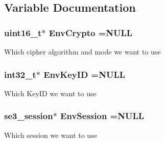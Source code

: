\subsection{Variable Documentation}
\hypertarget{group___environmental_vars_ga328037c714e95e56186f9d5f0842adea}{
\subsubsection[{Env\-Crypto}]{\setlength{\rightskip}{0pt plus 5cm}uint16\-\_\-t$\ast$ Env\-Crypto =N\-U\-L\-L\hspace{0.3cm}{\ttfamily [static]}}}\label{group___environmental_vars_ga328037c714e95e56186f9d5f0842adea}
Which cipher algorithm and mode we want to use \hypertarget{group___environmental_vars_ga7a8b4d6945f6a13f8683427dc7ab7a44}{
\subsubsection[{Env\-Key\-I\-D}]{\setlength{\rightskip}{0pt plus 5cm}int32\-\_\-t$\ast$ Env\-Key\-I\-D =N\-U\-L\-L\hspace{0.3cm}{\ttfamily [static]}}}\label{group___environmental_vars_ga7a8b4d6945f6a13f8683427dc7ab7a44}
Which Key\-I\-D we want to use \hypertarget{group___environmental_vars_gad3215e338581ce95b76b3b84b928d744}{
\subsubsection[{Env\-Session}]{\setlength{\rightskip}{0pt plus 5cm}se3\-\_\-session$\ast$ Env\-Session =N\-U\-L\-L\hspace{0.3cm}{\ttfamily [static]}}}\label{group___environmental_vars_gad3215e338581ce95b76b3b84b928d744}
Which session we want to use 